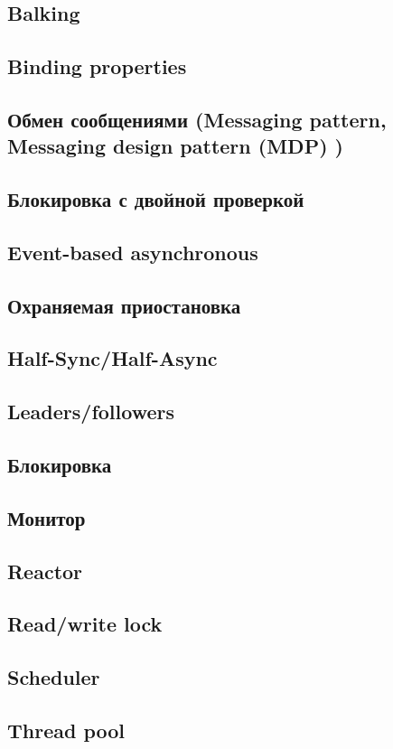 \subsection{Balking}
\subsection{Binding properties}
\subsection{Обмен сообщениями (Messaging pattern, Messaging design pattern (MDP) )}
\subsection{Блокировка с двойной проверкой}
\subsection{Event-based asynchronous}
\subsection{Охраняемая приостановка }
\subsection{Half-Sync/Half-Async}
\subsection{Leaders/followers}
\subsection{Блокировка}
\subsection{Монитор}
\subsection{Reactor}
\subsection{Read/write lock}
\subsection{Scheduler}
\subsection{Thread pool}
